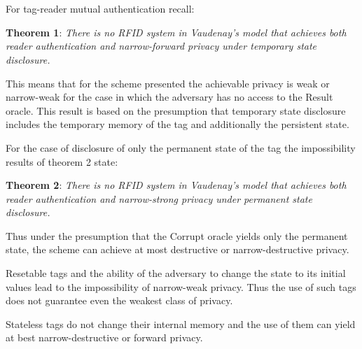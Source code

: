 \begin{adjustwidth}{-60pt}{}
{    %
    \<\<\\[-4ex]
    \< \<  \\[-1ex]
    \< \<  \\[-1ex]
    \< \<  \\[-1ex]
    \< \<  \\[-1ex]
    \< \<  \\[-4ex]
    \<  \< \\[-4ex]
    }
    \end{adjustwidth}
    
    For tag-reader mutual authentication recall:

    \textbf{Theorem 1}: \textit{There is no RFID system in Vaudenay's model that achieves both reader authentication and narrow-forward privacy 
    under temporary state disclosure.}

    This means that for the scheme presented the achievable privacy is weak or narrow-weak for the case in which the adversary has no
    access to the Result oracle. This result is based on the presumption that temporary state disclosure includes the temporary
    memory of the tag and additionally the persistent state.

    For the case of disclosure of only the permanent state of the tag the impossibility results of theorem 2 state:

    \textbf{Theorem 2}: \textit{There is no RFID system in Vaudenay's model that achieves both reader authentication and narrow-strong privacy 
    under permanent state disclosure.}

    Thus under the presumption that the Corrupt oracle yields only the permanent state, the scheme can achieve at most destructive or
    narrow-destructive privacy.

    Resetable tags and the ability of the adversary to change the state to its initial values lead to the impossibility of narrow-weak
    privacy. Thus the use of such tags does not guarantee even the weakest class of privacy.

    Stateless tags do not change their internal memory and the use of them can yield at best narrow-destructive or forward privacy.
